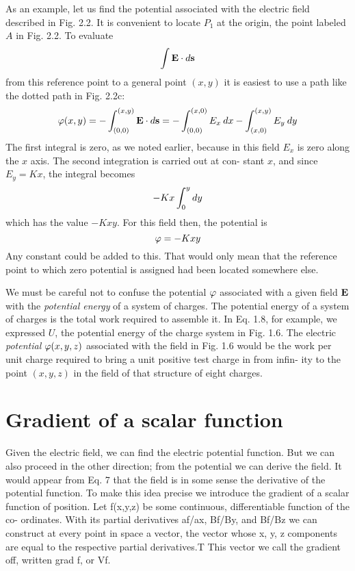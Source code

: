 As an example, let us find the potential associated with the electric
field described in Fig. 2.2. It is convenient to locate $P_1$ at the origin,
the point labeled $A$ in Fig. 2.2. To evaluate
\begin{equation}
  \int\mathbf{E}\cdot d\mathbf{s}
\end{equation}
from this reference point to a general point $(x,y)$ it is easiest to use
a path like the dotted path in Fig. 2.2c:
\begin{equation}
  \varphi(x,y) = -\int_{(0,0)}^{(x,y)}\mathbf{E}\cdot d\mathbf{s}
            = -\int_{(0,0)}^{(x,0)} E_x \: d x - \int_{(x,0)}^{(x,y)} E_y \: d y
\end{equation}
The first integral is zero, as we noted earlier, because in this field $E_x$
is zero along the $x$ axis. The second integration is carried out at con-
stant $x$, and since $E_y = Kx$, the integral becomes
\begin{equation}
  -Kx\int_0^y d y
\end{equation}
which has the value $-Kxy$. For this field then, the potential is
\begin{equation}
  \varphi = -Kxy
\end{equation}
Any constant could be added to this. That would only mean that the
reference point to which zero potential is assigned had been located
somewhere else.

We must be careful not to confuse the potential $\varphi$ associated with
a given field $\mathbf{E}$ with the \emph{potential energy} of a system of charges. The
potential energy of a system of charges is the total work required to
assemble it. In Eq. 1.8, for example, we expressed $U$, the potential
energy of the charge system in Fig. 1.6. The electric \emph{potential}
$\varphi(x,y,z)$ associated with the field in Fig. 1.6 would be the work per
unit charge required to bring a unit positive test charge in from infin-
ity to the point $(x,y,z)$ in the field of that structure of eight charges.

\iffalse

\section{Gradient of a scalar function}

Given the electric field, we can find the electric potential function.
But we can also proceed in the other direction; from the potential we
can derive the field. It would appear from Eq. 7 that the field is in
some sense the derivative of the potential function. To make this idea
precise we introduce the gradient of a scalar function of position.
Let f(x,y,z) be some continuous, differentiable function of the co-
ordinates. With its partial derivatives af/ax, Bf/By, and Bf/Bz we
can construct at every point in space a vector, the vector whose x, y, z
components are equal to the respective partial derivatives.T This
vector we call the gradient off, written grad f, or Vf.

